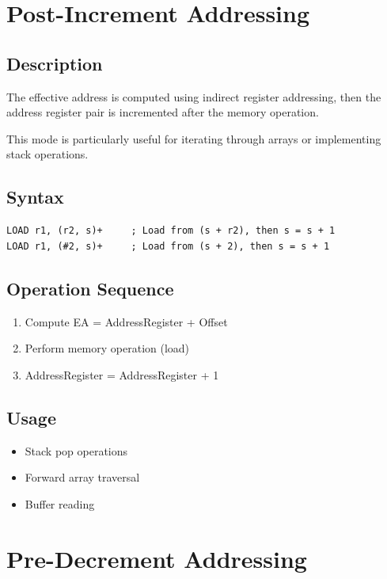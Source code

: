 \section{Post-Increment Addressing}

\subsection{Description}

The effective address is computed using indirect register addressing, then the address register pair is incremented
after the memory operation.

This mode is particularly useful for iterating through arrays or implementing stack operations.

\subsection{Syntax}

\begin{lstlisting}
LOAD r1, (r2, s)+     ; Load from (s + r2), then s = s + 1
LOAD r1, (#2, s)+     ; Load from (s + 2), then s = s + 1
\end{lstlisting}

\subsection{Operation Sequence}

\begin{enumerate}
	\item Compute EA = AddressRegister + Offset
	\item Perform memory operation (load)
	\item AddressRegister = AddressRegister + 1
\end{enumerate}

\subsection{Usage}

\begin{itemize}
	\item Stack pop operations
	\item Forward array traversal
	\item Buffer reading
\end{itemize}

\section{Pre-Decrement Addressing}

